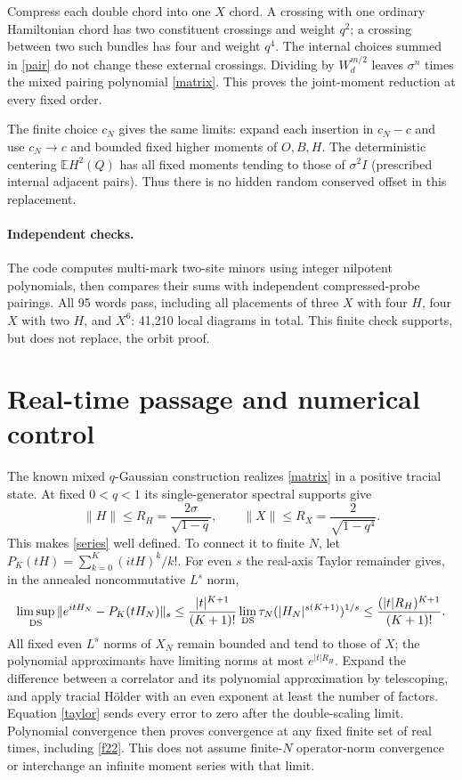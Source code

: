\documentclass[11pt,a4paper]{article}
\newcommand{\E}{\mathbb E}
\begin{document}
Compress each double chord into one $X$ chord. A crossing with one
ordinary Hamiltonian chord has two constituent crossings and weight
$q^2$; a crossing between two such bundles has four and weight $q^4$.
The internal choices summed in \eqref{pair} do not change these external
crossings. Dividing by $W_d^{m/2}$ leaves $\sigma^n$ times the mixed
pairing polynomial \eqref{matrix}. This proves the joint-moment reduction
at every fixed order.

The finite choice $c_N$ gives the same limits: expand each insertion
in $c_N-c$ and use $c_N\to c$ and bounded fixed higher moments of $O,B,H$.
The deterministic centering $\E H^2(Q)$ has all fixed moments tending to
those of $\sigma^2I$ (prescribed internal adjacent pairs). Thus there is
no hidden random conserved offset in this replacement.

\paragraph{Independent checks.}
The code computes multi-mark two-site minors using integer nilpotent
polynomials, then compares their sums with independent compressed-probe
pairings. All 95 words pass, including all placements of three $X$ with
four $H$, four $X$ with two $H$, and $X^6$: 41,210 local diagrams in total.
This finite check supports, but does not replace, the orbit proof.

\newpage
\section{Real-time passage and numerical control}
The known mixed $q$-Gaussian construction \cite{jz} realizes
\eqref{matrix} in a positive tracial state. At fixed $0<q<1$ its
single-generator spectral supports give
\begin{equation}
 \|H\|\le R_H=\frac{2\sigma}{\sqrt{1-q}},\qquad
 \|X\|\le R_X=\frac{2}{\sqrt{1-q^4}}.
\end{equation}
This makes \eqref{series} well defined. To connect it to finite $N$,
let $P_K(tH)=\sum_{k=0}^K(itH)^k/k!$. For even $s$ the real-axis
Taylor remainder gives, in the annealed noncommutative $L^s$ norm,
\begin{equation}
 \limsup_{\rm DS}\|e^{itH_N}-P_K(tH_N)\|_s
 \le\frac{|t|^{K+1}}{(K+1)!}
 \lim_{\rm DS}\tau_N(|H_N|^{s(K+1)})^{1/s}
 \le\frac{(|t|R_H)^{K+1}}{(K+1)!}.\label{taylor}
\end{equation}
All fixed even $L^s$ norms of $X_N$ remain bounded and tend to those of
$X$; the polynomial approximants have limiting norms at most
$e^{|t|R_H}$. Expand the difference between a correlator and its polynomial
approximation by telescoping, and apply tracial H\"older with an even
exponent at least the number of factors. Equation \eqref{taylor} sends
every error to zero after the double-scaling limit. Polynomial convergence
then proves convergence at any fixed finite set of real times, including
\eqref{f22}. This does not assume finite-$N$ operator-norm convergence or
interchange an infinite moment series with that limit.
\end{document}
